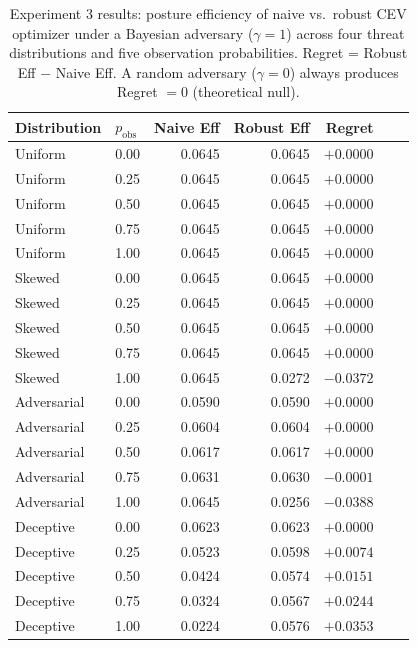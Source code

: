 \documentclass[11pt]{article}
\begin{document}
\begin{table}[htbp]
\centering
\caption{Experiment 3 results: posture efficiency of naive vs.\ robust CEV
optimizer under a Bayesian adversary ($\gamma = 1$) across four threat
distributions and five observation probabilities.
Regret = Robust Eff $-$ Naive Eff.
A random adversary ($\gamma=0$) always produces Regret $= 0$ (theoretical null).}
\label{tab:exp3_bayesian}
\begin{tabular}{llrrrrr}
\toprule
Distribution & $p_\mathrm{obs}$ & Naive Eff & Robust Eff & Regret \\
\midrule
Uniform      & 0.00 & 0.0645 & 0.0645 & $+0.0000$ \\
Uniform      & 0.25 & 0.0645 & 0.0645 & $+0.0000$ \\
Uniform      & 0.50 & 0.0645 & 0.0645 & $+0.0000$ \\
Uniform      & 0.75 & 0.0645 & 0.0645 & $+0.0000$ \\
Uniform      & 1.00 & 0.0645 & 0.0645 & $+0.0000$ \\
\midrule
Skewed       & 0.00 & 0.0645 & 0.0645 & $+0.0000$ \\
Skewed       & 0.25 & 0.0645 & 0.0645 & $+0.0000$ \\
Skewed       & 0.50 & 0.0645 & 0.0645 & $+0.0000$ \\
Skewed       & 0.75 & 0.0645 & 0.0645 & $+0.0000$ \\
Skewed       & 1.00 & 0.0645 & 0.0272 & $-0.0372$ \\
\midrule
Adversarial  & 0.00 & 0.0590 & 0.0590 & $+0.0000$ \\
Adversarial  & 0.25 & 0.0604 & 0.0604 & $+0.0000$ \\
Adversarial  & 0.50 & 0.0617 & 0.0617 & $+0.0000$ \\
Adversarial  & 0.75 & 0.0631 & 0.0630 & $-0.0001$ \\
Adversarial  & 1.00 & 0.0645 & 0.0256 & $-0.0388$ \\
\midrule
Deceptive    & 0.00 & 0.0623 & 0.0623 & $+0.0000$ \\
Deceptive    & 0.25 & 0.0523 & 0.0598 & $+0.0074$ \\
Deceptive    & 0.50 & 0.0424 & 0.0574 & $+0.0151$ \\
Deceptive    & 0.75 & 0.0324 & 0.0567 & $+0.0244$ \\
Deceptive    & 1.00 & 0.0224 & 0.0576 & $+0.0353$ \\
\bottomrule
\end{tabular}
\end{table}
\end{document}
